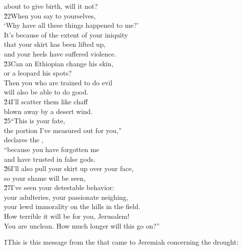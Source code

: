 \begin{poetry}
\poemll    about to give birth, will it not? \\
\poeml \v{22}When you say to yourselves, \\
\poemll    `Why have all these things happened to me?' \\
\poeml It's because of the extent of your iniquity \\
\poemll    that your skirt has been lifted up, \\
\poemlll       and your heels have suffered violence. \\
\poeml \v{23}Can an Ethiopian change his skin, \\
\poemll    or a leopard his spots? \\
\poeml Then you who are trained to do evil \\
\poemll    will also be able to do good. \\
\poeml \v{24}I'll scatter them like chaff \\
\poemll    blown away by a desert wind. \\
\poeml \v{25}``This is your fate, \\
\poemll    the portion I've measured out for you,'' \\
\poemlll       declares the , \\
\poeml ``because you have forgotten me \\
\poemll    and have trusted in false gods. \\
\poeml \v{26}I'll also pull your skirt up over your face, \\
\poemll    so your shame will be seen, \\
\poeml \v{27}I've seen your detestable behavior: \\
\poemll    your adulteries, your passionate neighing, \\
\poemlll       your lewd immorality on the hills in the field. \\
\poeml How terrible it will be for you, Jerusalem! \\
\poemll    You are unclean. How much longer will this go on?''
\end{poetry}

\v{1}This is this message from the  that came to Jeremiah concerning the drought:

